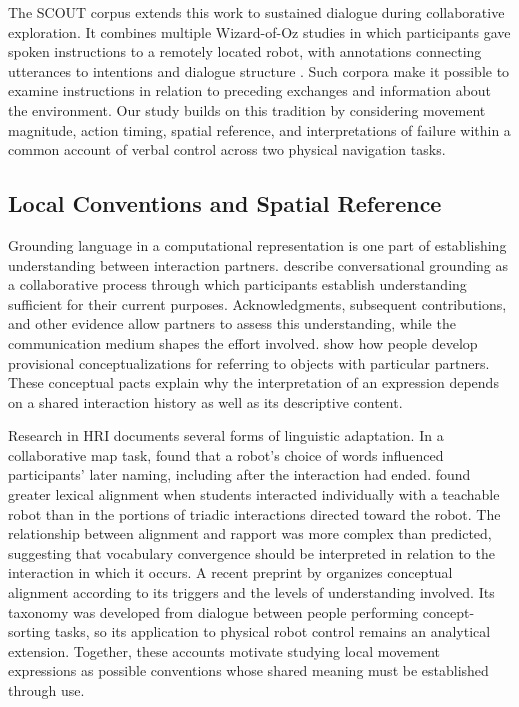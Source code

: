 The SCOUT corpus extends this work to sustained dialogue during collaborative exploration. It combines multiple Wizard-of-Oz studies in which participants gave spoken instructions to a remotely located robot, with annotations connecting utterances to intentions and dialogue structure \citep{lukin2024scout}. Such corpora make it possible to examine instructions in relation to preceding exchanges and information about the environment. Our study builds on this tradition by considering movement magnitude, action timing, spatial reference, and interpretations of failure within a common account of verbal control across two physical navigation tasks.

\subsection{Local Conventions and Spatial Reference}

Grounding language in a computational representation is one part of establishing understanding between interaction partners. \citet{clark1991grounding} describe conversational grounding as a collaborative process through which participants establish understanding sufficient for their current purposes. Acknowledgments, subsequent contributions, and other evidence allow partners to assess this understanding, while the communication medium shapes the effort involved. \citet{brennan1996pacts} show how people develop provisional conceptualizations for referring to objects with particular partners. These conceptual pacts explain why the interpretation of an expression depends on a shared interaction history as well as its descriptive content.

Research in HRI documents several forms of linguistic adaptation. In a collaborative map task, \citet{brandstetter2017entrainment} found that a robot's choice of words influenced participants' later naming, including after the interaction had ended. \citet{asano2022alignment} found greater lexical alignment when students interacted individually with a teachable robot than in the portions of triadic interactions directed toward the robot. The relationship between alignment and rapport was more complex than predicted, suggesting that vocabulary convergence should be interpreted in relation to the interaction in which it occurs. A recent preprint by \citet{zhang2026alignment} organizes conceptual alignment according to its triggers and the levels of understanding involved. Its taxonomy was developed from dialogue between people performing concept-sorting tasks, so its application to physical robot control remains an analytical extension. Together, these accounts motivate studying local movement expressions as possible conventions whose shared meaning must be established through use.

